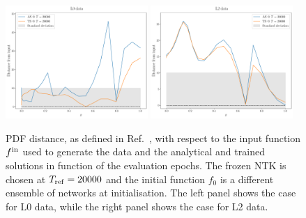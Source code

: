\FloatBarrier




  \begin{figure}[ht!]
    \centering
    \includegraphics[width=0.48\textwidth]{plots/analytical_solution/distance_from_input/distance_plot_from_input_epoch_20000_L0.pdf}
    \includegraphics[width=0.48\textwidth]{plots/analytical_solution/distance_from_input/distance_plot_from_input_epoch_20000_L2.pdf}
    \caption{PDF distance, as defined in Ref.~\cite{NNPDF:2021njg}, with respect to
    the input function $f^{\rm in}$ used to generate the data and the analytical and trained
    solutions in function of the evaluation epochs. The frozen NTK
    is chosen at $T_{\rm ref} = 20000$ and the initial function $f_0$ is a different
    ensemble of networks at initialisation. The left panel shows the case for L0 data,
    while the right panel shows the case for L2 data.}
    \label{fig:xT3_distance_L0_L2}
  \end{figure}



